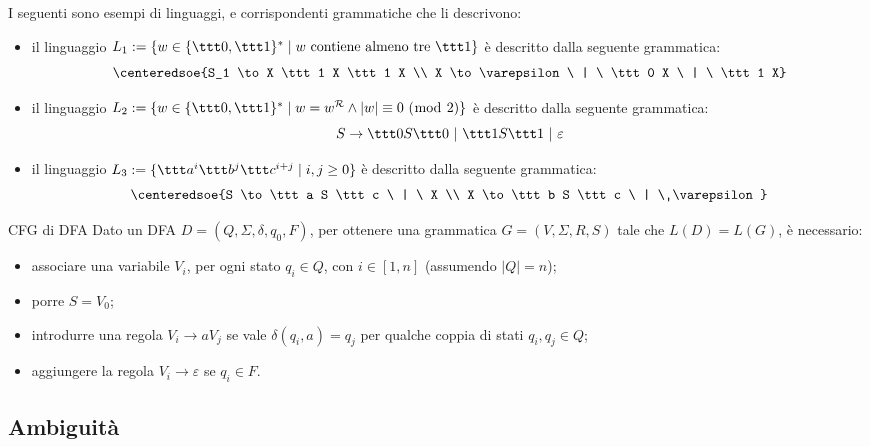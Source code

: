 \documentclass[a4paper, 12pt]{report}
\begin{document}
    \begin{example}
        I seguenti sono esempi di linguaggi, e corrispondenti grammatiche che li descrivono:

        \begin{itemize}
            \item il linguaggio $L_1 := \{w \in \{\ttt 0, \ttt 1\}^* \mid w \ \mathrm{contiene \ almeno \ tre \ \ttt 1}\}$ è descritto dalla seguente grammatica: $$\centeredsoe{S_1 \to X \ttt 1 X \ttt 1 X \\ X \to \varepsilon \ | \ \ttt 0 X \ | \ \ttt 1 X}$$
            \item il linguaggio $L_2 := \{w \in \{\ttt 0, \ttt 1\}^* \mid w = w ^\mathcal{R} \land |w| \equiv 0 \ (\bmod \ 2)\}$ è descritto dalla seguente grammatica: $$S \to \ttt 0 S \ttt 0 \ | \ \ttt 1 S \ttt 1 \ | \ \varepsilon$$
            \item il linguaggio $L_3 := \{\ttt a^i \ttt b^j \ttt c^{i + j} \mid i, j \ge 0\}$ è descritto dalla seguente grammatica: $$\centeredsoe{S \to \ttt a S \ttt c \ | \ X \\ X \to \ttt b S \ttt c \ | \ \varepsilon}$$
        \end{itemize}
    \end{example}

    \begin{framedmeth}{CFG di DFA}
        Dato un DFA $D = (Q, \Sigma, \delta, q_0, F)$, per ottenere una grammatica $G = (V, \Sigma, R, S)$ tale che $L(D) = L(G)$, è necessario:

        \begin{itemize}
            \item associare una variabile $V_i$, per ogni stato $q_i \in Q$, con $i \in [1, n]$ (assumendo $|Q| = n$);
            \item porre $S = V_0$;
            \item introdurre una regola $V_i \to a V_j$ se vale $\delta(q_i, a) = q_j$ per qualche coppia di stati $q_i, q_j \in Q$;
            \item aggiungere la regola $V_i \to \varepsilon$ se $q_i \in F$.
        \end{itemize}
    \end{framedmeth}
   
    \subsection{Ambiguità}
\end{document}
